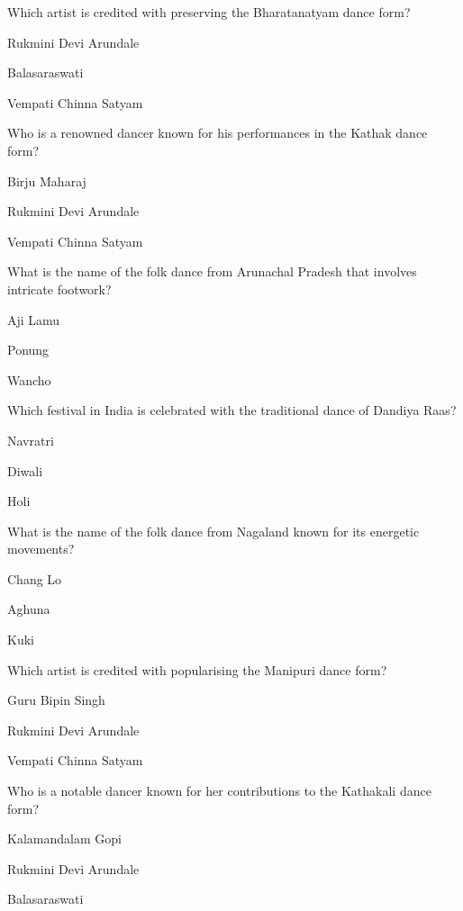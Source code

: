 \begin{enhancedmcq}{Which artist is credited with preserving the Bharatanatyam dance form?}
\item Rukmini Devi Arundale
\item Balasaraswati
\item Vempati Chinna Satyam

\end{enhancedmcq}
\begin{enhancedmcq}{Who is a renowned dancer known for his performances in the Kathak dance form?}
\item Birju Maharaj
\item Rukmini Devi Arundale
\item Vempati Chinna Satyam

\end{enhancedmcq}
\begin{enhancedmcq}{What is the name of the folk dance from Arunachal Pradesh that involves intricate footwork?}
\item Aji Lamu
\item Ponung
\item Wancho

\end{enhancedmcq}
\begin{enhancedmcq}{Which festival in India is celebrated with the traditional dance of Dandiya Raas?}
\item Navratri
\item Diwali
\item Holi

\end{enhancedmcq}
\begin{enhancedmcq}{What is the name of the folk dance from Nagaland known for its energetic movements?}
\item Chang Lo
\item Aghuna
\item Kuki

\end{enhancedmcq}
\begin{enhancedmcq}{Which artist is credited with popularising the Manipuri dance form?}
\item Guru Bipin Singh
\item Rukmini Devi Arundale
\item Vempati Chinna Satyam

\end{enhancedmcq}
\begin{enhancedmcq}{Who is a notable dancer known for her contributions to the Kathakali dance form?}
\item Kalamandalam Gopi
\item Rukmini Devi Arundale
\item Balasaraswati

\end{enhancedmcq}
